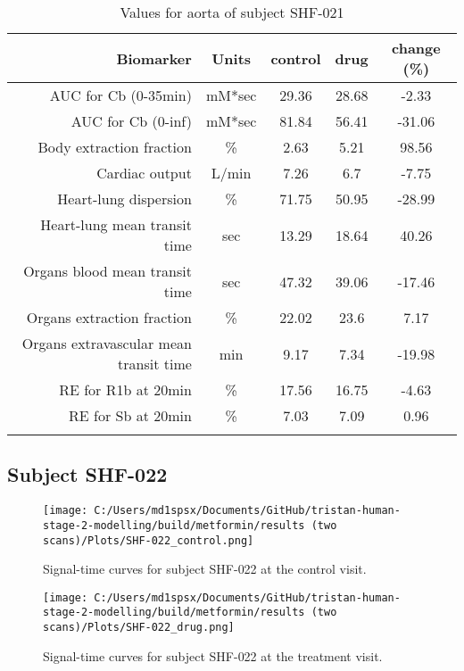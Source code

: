 \documentclass{epflreport}%
\begin{document}
\begin{longtable}{rcccc}%
\hline%
Biomarker&Units&control&drug&change (\%)\\%
\hline%
AUC for Cb (0{-}35min)&mM*sec&29.36&28.68&{-}2.33\\%
AUC for Cb (0{-}inf)&mM*sec&81.84&56.41&{-}31.06\\%
Body extraction fraction&\%&2.63&5.21&98.56\\%
Cardiac output&L/min&7.26&6.7&{-}7.75\\%
Heart{-}lung dispersion&\%&71.75&50.95&{-}28.99\\%
Heart{-}lung mean transit time&sec&13.29&18.64&40.26\\%
Organs blood mean transit time&sec&47.32&39.06&{-}17.46\\%
Organs extraction fraction&\%&22.02&23.6&7.17\\%
Organs extravascular mean transit time&min&9.17&7.34&{-}19.98\\%
RE for R1b at 20min&\%&17.56&16.75&{-}4.63\\%
RE for Sb at 20min&\%&7.03&7.09&0.96\\%
\hline%
\caption{Values for aorta of subject SHF-021} \\%
\end{longtable}%
\clearpage%
\subsection{Subject SHF{-}022}%
\label{subsec:SubjectSHF{-}022}%

%


\begin{figure}[h!]%
\centering%
\texttt{[image: C:/Users/md1spsx/Documents/GitHub/tristan-human-stage-2-modelling/build/metformin/results (two scans)/Plots/SHF-022\_control.png]}%
\caption{Signal{-}time curves for subject SHF{-}022 at the control visit.}%
\end{figure}

%


\begin{figure}[h!]%
\centering%
\texttt{[image: C:/Users/md1spsx/Documents/GitHub/tristan-human-stage-2-modelling/build/metformin/results (two scans)/Plots/SHF-022\_drug.png]}%
\caption{Signal{-}time curves for subject SHF{-}022 at the treatment visit.}%
\end{figure}
\end{document}
